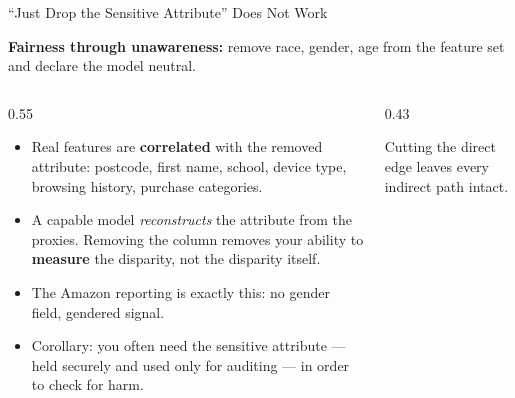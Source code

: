 
\begin{frame}{``Just Drop the Sensitive Attribute'' Does Not Work}

    \textbf{Fairness through unawareness:} remove race, gender, age from the feature set and
    declare the model neutral.

    \vspace{0.8em}

    \begin{columns}[T]
        \begin{column}{0.55\textwidth}
            \begin{itemize}\small
                \setlength\itemsep{0.4em}
                \item Real features are \textbf{correlated} with the removed attribute: postcode,
                      first name, school, device type, browsing history, purchase categories.
                \item A capable model \emph{reconstructs} the attribute from the proxies. Removing
                      the column removes your ability to \textbf{measure} the disparity, not the
                      disparity itself.
                \item The Amazon reporting is exactly this: no gender field, gendered signal.
                \item Corollary: you often need the sensitive attribute --- held securely and used
                      only for auditing --- in order to check for harm.
            \end{itemize}
        \end{column}
        \begin{column}{0.43\textwidth}
            \centering

            \vspace{0.2em}
            {\scriptsize Cutting the direct edge leaves every indirect path intact.\par}
        \end{column}
    \end{columns}
\end{frame}
